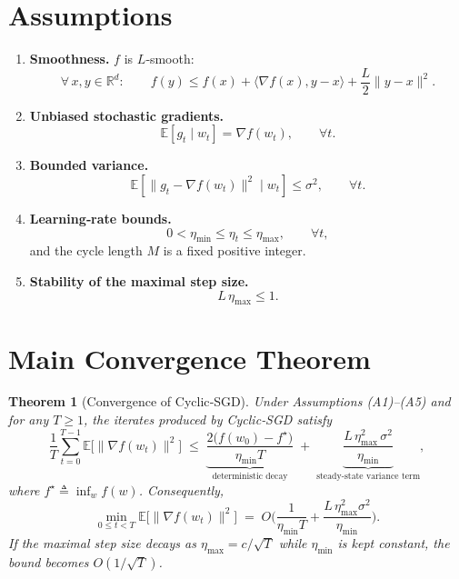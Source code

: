 \documentclass[11pt]{article}
\newtheorem{theorem}{Theorem}
\newcommand{\E}{\mathbb{E}}
\newcommand{\R}{\mathbb{R}}
\begin{document}
\section*{Assumptions}
\begin{enumerate}
    \item \textbf{Smoothness.} $f$ is $L$‑smooth:
    \[
    \forall\,x,y\in\R^{d}:\qquad 
    f(y)\le f(x)+\langle\nabla f(x),y-x\rangle+\frac{L}{2}\|y-x\|^{2}.
    \tag{A1}
    \]
    \item \textbf{Unbiased stochastic gradients.}
    \[
    \E\!\left[g_{t}\mid w_{t}\right]=\nabla f(w_{t}),\qquad\forall t.
    \tag{A2}
    \]
    \item \textbf{Bounded variance.}
    \[
    \E\!\left[\|g_{t}-\nabla f(w_{t})\|^{2}\mid w_{t}\right]\le\sigma^{2},
    \qquad\forall t.
    \tag{A3}
    \]
    \item \textbf{Learning‑rate bounds.}
    \[
    0<\eta_{\min}\le \eta_{t}\le\eta_{\max},\qquad\forall t,
    \tag{A4}
    \]
    and the cycle length $M$ is a fixed positive integer.
    \item \textbf{Stability of the maximal step size.}
    \[
    L\,\eta_{\max}\le 1.
    \tag{A5}
    \]
\end{enumerate}

\section*{Main Convergence Theorem}
\begin{theorem}[Convergence of Cyclic‑SGD]\label{thm:main}
Under Assumptions (A1)–(A5) and for any $T\ge 1$, the iterates produced by Cyclic‑SGD satisfy
\[
\frac{1}{T}\sum_{t=0}^{T-1}\E\!\big[\|\nabla f(w_{t})\|^{2}\big]
\;\le\;
\underbrace{\frac{2\big(f(w_{0})-f^{\star}\big)}{\eta_{\min}T}}_{\text{deterministic decay}}
\;+\;
\underbrace{\frac{L\,\eta_{\max}^{2}\,\sigma^{2}}{\eta_{\min}}}_{\text{steady‑state variance term}},
\tag{1}
\]
where $f^{\star}\triangleq\inf_{w}f(w)$. Consequently,
\[
\min_{0\le t<T}\E\!\big[\|\nabla f(w_{t})\|^{2}\big]
\;=\;O\!\Big(\frac{1}{\eta_{\min}T}
      +\frac{L\,\eta_{\max}^{2}\sigma^{2}}{\eta_{\min}}\Big).
\]
If the maximal step size decays as $\eta_{\max}=c/\sqrt{T}$ while $\eta_{\min}$ is kept constant,
the bound becomes $O(1/\sqrt{T})$.
\end{theorem}

\end{document}
